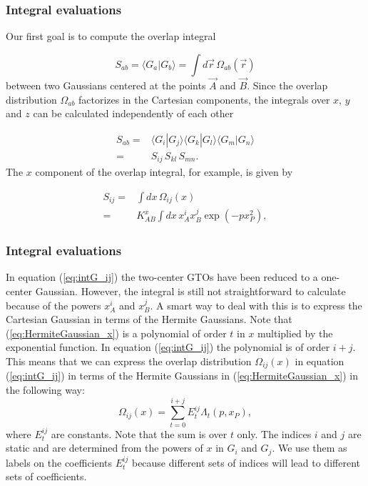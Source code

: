 \documentclass{beamer}
\begin{document}
\begin{frame}
\frametitle{Integral evaluations}

\begin{block}{}

Our first goal is to compute the overlap integral

\begin{equation}
S_{ab}  = \langle G_a|G_b\rangle = \int d\vec r \,\Omega_{ab}(\vec r)
\end{equation}
between two Gaussians centered at the points $\vec A$ and $\vec B$.
Since the overlap distribution $\Omega_{ab}$ factorizes in the Cartesian components, the integrals over $x$, $y$ and $z$ can be calculated independently of each other

\begin{equation}
\begin{split}
 S_{ab} = & \langle G_i|G_j\rangle \langle G_k|G_l\rangle \langle G_m|G_n\rangle \\
        = & S_{ij}\,S_{kl}\,S_{mn}.
\end{split}
\end{equation}
The $x$ component of the overlap integral, for example, is given by

\begin{equation}
\label{eq:intG_ij}
\begin{split}
 S_{ij} = & \int dx \,\Omega_{ij}(x) \\
        = & K_{AB}^x\int dx \,x_A^ix_B^j\exp(-px_P^2),
\end{split}
\end{equation}
\end{block}
\end{frame}

\begin{frame}
\frametitle{Integral evaluations}

\begin{block}{}

In equation (\ref{eq:intG_ij}) the two-center GTOs have been reduced to a one-center Gaussian.
However, the integral is still not straightforward to calculate because of the powers $x_A^i$ and $x_B^j$. A smart way to deal with this is to express the Cartesian Gaussian
in terms of the Hermite Gaussians. Note that (\ref{eq:HermiteGaussian_x}) is a polynomial of order $t$ in $x$ multiplied by the exponential function. In equation (\ref{eq:intG_ij}) the polynomial
is of order $i+j$. This means that we can express the overlap distribution $\Omega_{ij}(x)$ in equation (\ref{eq:intG_ij}) in terms of the Hermite Gaussians in (\ref{eq:HermiteGaussian_x}) in the following way:
\begin{equation}
\label{eq:LinCombOfHermGauss}
 \Omega_{ij}(x) = \sum_{t=0}^{i+j} E^{ij}_t \Lambda_t(p, x_P),
\end{equation}
where $E^{ij}_t$ are constants.
Note that the sum is over $t$ only. The indices $i$ and $j$ are static and are determined from the powers of $x$ in $G_i$ and $G_j$.
We use them as labels on the coefficients $E^{ij}_t$ because different sets of indices will lead to different sets of coefficients.
\end{block}
\end{frame}
\end{document}

